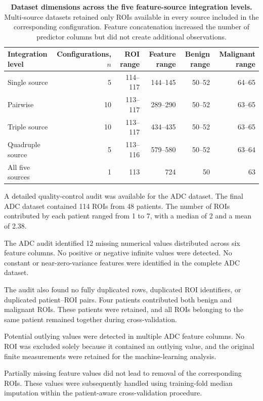 \documentclass[12pt,twocolumn]{article}
\begin{document}
\begin{table}[htbp]
\centering
\caption{\textbf{Dataset dimensions across the five feature-source
integration levels.} Multi-source datasets retained only ROIs available
in every source included in the corresponding configuration. Feature
concatenation increased the number of predictor columns but did not
create additional observations.}
\label{tab:fusion_dataset_characteristics}
\small
\begin{tabular}{lrrrrr}
\toprule
\textbf{Integration level} &
\textbf{Configurations, \(n\)} &
\textbf{ROI range} &
\textbf{Feature range} &
\textbf{Benign range} &
\textbf{Malignant range} \\
\midrule
Single source       & 5  & 114--117 & 144--145 & 50--52 & 64--65 \\
Pairwise            & 10 & 113--117 & 289--290 & 50--52 & 63--65 \\
Triple source       & 10 & 113--117 & 434--435 & 50--52 & 63--65 \\
Quadruple source    & 5  & 113--116 & 579--580 & 50--52 & 63--64 \\
All five sources    & 1  & 113      & 724      & 50     & 63 \\
\bottomrule
\end{tabular}
\end{table}

A detailed quality-control audit was available for the ADC dataset.
The final ADC dataset contained 114 ROIs from 48 patients. The number
of ROIs contributed by each patient ranged from 1 to 7, with a median
of 2 and a mean of 2.38.

The ADC audit identified 12 missing numerical values distributed across
six feature columns. No positive or negative infinite values were
detected. No constant or near-zero-variance features were identified
in the complete ADC dataset.

The audit also found no fully duplicated rows, duplicated ROI
identifiers, or duplicated patient--ROI pairs. Four patients contributed
both benign and malignant ROIs. These patients were retained, and all
ROIs belonging to the same patient remained together during
cross-validation.

Potential outlying values were detected in multiple ADC feature
columns. No ROI was excluded solely because it contained an outlying
value, and the original finite measurements were retained for the
machine-learning analysis.

Partially missing feature values did not lead to removal of the
corresponding ROIs. These values were subsequently handled using
training-fold median imputation within the patient-aware
cross-validation procedure.
\end{document}
